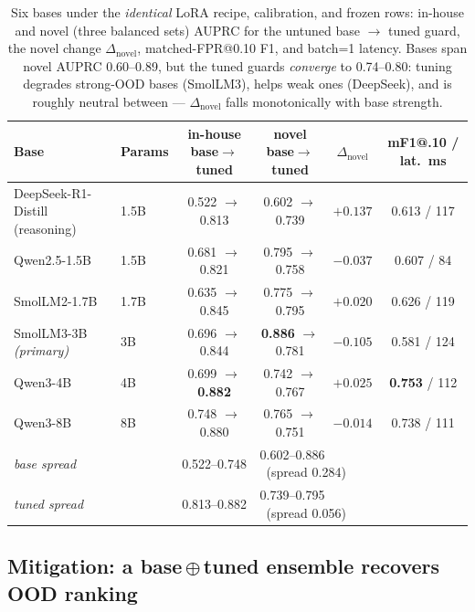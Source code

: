 \documentclass[sigconf,nonacm]{acmart}
\begin{document}
\begin{table}[t]
\small\centering\setlength{\tabcolsep}{4pt}
\caption{Six bases under the \emph{identical} LoRA recipe, calibration, and frozen rows: in-house and novel (three balanced sets) AUPRC for the untuned base $\to$ tuned guard, the novel change $\Delta_{\text{novel}}$, matched-FPR@0.10 F1, and batch=1 latency. Bases span novel AUPRC 0.60--0.89, but the tuned guards \emph{converge} to 0.74--0.80: tuning degrades strong-OOD bases (SmolLM3), helps weak ones (DeepSeek), and is roughly neutral between --- $\Delta_{\text{novel}}$ falls monotonically with base strength.}
\label{tab:slm-sweep}
\begin{tabular}{llcccc}
\toprule
Base & Params & in-house base$\to$tuned & novel base$\to$tuned & $\Delta_{\text{novel}}$ & mF1@.10 / lat.\ ms \\
\midrule
DeepSeek-R1-Distill (reasoning) & 1.5B & 0.522 $\to$ 0.813 & 0.602 $\to$ 0.739 & $+0.137$ & 0.613 / 117 \\
Qwen2.5-1.5B          & 1.5B & 0.681 $\to$ 0.821 & 0.795 $\to$ 0.758 & $-0.037$ & 0.607 / 84 \\
SmolLM2-1.7B          & 1.7B & 0.635 $\to$ 0.845 & 0.775 $\to$ 0.795 & $+0.020$ & 0.626 / 119 \\
SmolLM3-3B \emph{(primary)}  & 3B & 0.696 $\to$ 0.844 & \textbf{0.886} $\to$ 0.781 & $-0.105$ & 0.581 / 124 \\
Qwen3-4B              & 4B & 0.699 $\to$ \textbf{0.882} & 0.742 $\to$ 0.767 & $+0.025$ & \textbf{0.753} / 112 \\
Qwen3-8B              & 8B & 0.748 $\to$ 0.880 & 0.765 $\to$ 0.751 & $-0.014$ & 0.738 / 111 \\
\midrule
\emph{base spread} & & 0.522--0.748 & \multicolumn{2}{l}{0.602--0.886 \ (spread 0.284)} & \\
\emph{tuned spread} & & 0.813--0.882 & \multicolumn{2}{l}{0.739--0.795 \ (spread 0.056)} & \\
\bottomrule
\end{tabular}
\end{table}

\subsection{Mitigation: a base\,$\oplus$\,tuned ensemble recovers OOD ranking}
\label{sec:ensemble}
\end{document}
